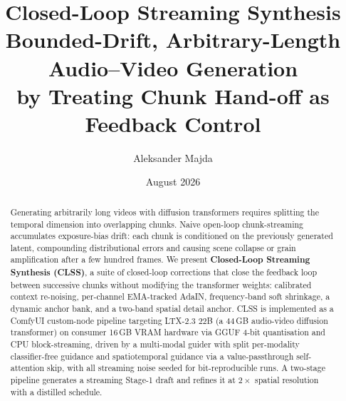 \documentclass[12pt]{article}
\title{\textbf{Closed-Loop Streaming Synthesis}\\[2pt]
\textbf{Bounded-Drift, Arbitrary-Length Audio--Video Generation}\\
\textbf{by Treating Chunk Hand-off as Feedback Control}}
\author{Aleksander Majda\\
}
\date{August 2026}
\begin{document}
\maketitle

\begin{abstract}
Generating arbitrarily long videos with diffusion transformers requires splitting the
temporal dimension into overlapping chunks.  Naive open-loop chunk-streaming
accumulates exposure-bias drift: each chunk is conditioned on the previously
generated latent, compounding distributional errors and causing scene collapse or
grain amplification after a few hundred frames.  We present
\textbf{Closed-Loop Streaming Synthesis (CLSS)}, a suite of closed-loop corrections
that close the feedback loop between successive chunks without modifying the
transformer weights: calibrated context re-noising, per-channel EMA-tracked
AdaIN, frequency-band soft shrinkage, a dynamic anchor bank, and a two-band
spatial detail anchor.  CLSS is implemented as a ComfyUI custom-node pipeline
targeting LTX-2.3 22B (a 44\,GB audio-video diffusion transformer) on consumer
16\,GB VRAM hardware via GGUF 4-bit quantisation and CPU block-streaming, driven
by a multi-modal guider with split per-modality classifier-free guidance and
spatiotemporal guidance via a value-passthrough self-attention skip, with all
streaming noise seeded for bit-reproducible runs.  A two-stage pipeline
generates a streaming Stage-1 draft and refines it at $2\times$ spatial
resolution with a distilled schedule.


\end{abstract}
\end{document}
